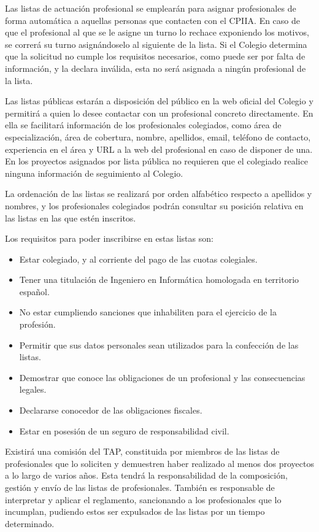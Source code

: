 Las listas de actuación profesional se emplearán para asignar profesionales de forma automática a aquellas personas que contacten con el CPIIA. En caso de que el profesional al que se le asigne un turno lo rechace exponiendo los motivos, se correrá su turno asignándoselo al siguiente de la lista. Si el Colegio determina que la solicitud no cumple los requisitos necesarios, como puede ser por falta de información, y la declara inválida, esta no será asignada a ningún profesional de la lista.

Las listas públicas estarán a disposición del público en la web oficial del Colegio y permitirá a quien lo desee contactar con un profesional concreto directamente. En ella se facilitará información de los profesionales colegiados, como área de especialización, área de cobertura, nombre, apellidos, email, teléfono de contacto, experiencia en el área y URL a la web del profesional en caso de disponer de una. En los proyectos asignados por lista pública no requieren que el colegiado realice ninguna información de seguimiento al Colegio.

La ordenación de las listas se realizará por orden alfabético respecto a apellidos y nombres, y los profesionales colegiados podrán consultar su posición relativa en las listas en las que estén inscritos.

Los requisitos para poder inscribirse en estas listas son:
\begin{itemize}
\item Estar colegiado, y al corriente del pago de las cuotas colegiales.
\item Tener una titulación de Ingeniero en Informática homologada en territorio español.
\item No estar cumpliendo sanciones que inhabiliten para el ejercicio de la profesión.
\item Permitir que sus datos personales sean utilizados para la confección de las listas.
\item Demostrar que conoce las obligaciones de un profesional y las consecuencias legales.
\item Declararse conocedor de las obligaciones fiscales.
\item Estar en posesión de un seguro de responsabilidad civil.
\end{itemize} 

Existirá una comisión del TAP, constituida por miembros de las listas de profesionales que lo soliciten y demuestren haber realizado al menos dos proyectos a lo largo de varios años. Esta tendrá la responsabilidad de la composición, gestión y envío de las listas de profesionales. También es responsable de interpretar y aplicar el reglamento, sancionando a los profesionales que lo incumplan, pudiendo estos ser expulsados de las listas por un tiempo determinado.

